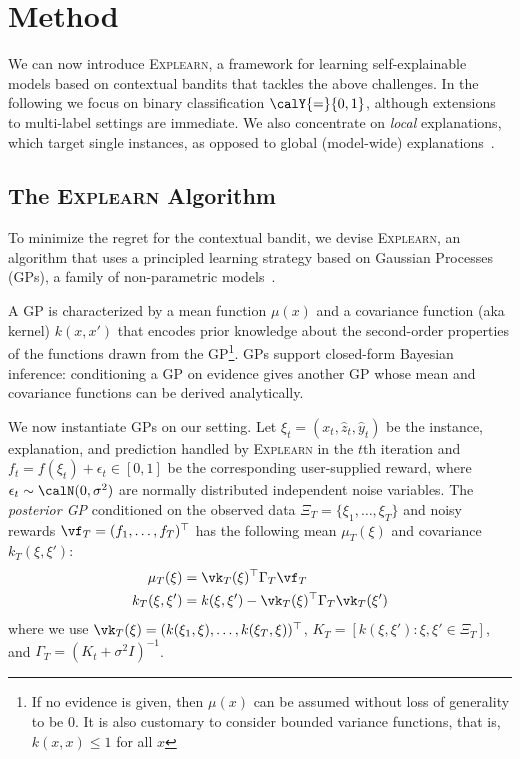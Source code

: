 \documentclass[letterpaper]{article} %
\newcommand{\explearn}{\textsc{Explearn}\xspace}
\begin{document}
\section{Method}\label{sec:solution}

We can now introduce \explearn, a framework for learning self-explainable models based on contextual bandits that tackles the above challenges.
%
In the following we focus on binary classification $\calY {=} \{0, 1\}$,  although extensions to multi-label settings are immediate.  We also concentrate on \emph{local} explanations, which target single instances, as opposed to global (model-wide) explanations~\cite{bastani2017interpreting}.


\subsection{The \explearn Algorithm}

To minimize the regret for the contextual bandit, we devise \explearn, an algorithm that uses a principled learning strategy based on Gaussian Processes (GPs), a family of non-parametric models~\cite{rasmussen2006gaussian}.

A GP is characterized by a mean function $\mu(x)$ and a covariance function (aka kernel) $k(x,x')$ that encodes prior knowledge about the second-order properties of the functions drawn from the GP\footnote{If no evidence is given, then $\mu(x)$ can be assumed without loss of generality to be $0$.  It is also customary to consider bounded variance functions, that is, $k(x,x) \le 1$ for all $x$}.  GPs support closed-form Bayesian inference:  conditioning a GP on evidence gives another GP whose mean and covariance functions can be derived analytically.

We now instantiate GPs on our setting.  Let $\xi_t = (x_t, \hat{z}_t, \hat{y}_t)$  be the instance, explanation, and prediction handled by \explearn in the $t$th iteration and $f_t = f(\xi_t) + \epsilon_t \in [0, 1]$ be the corresponding user-supplied reward, where $\epsilon_t \sim \calN(0, \sigma^2)$ are normally distributed independent noise variables.
The \emph{posterior GP} conditioned on the observed data $\Xi_T = \{\xi_1, \ldots, \xi_T\}$ and noisy rewards $\vf_T = (f_1, \ldots, f_T)^\top$ has the following mean $\mu_T(\xi)$ and covariance $k_T(\xi, \xi')$:
%
\begin{align}
    \mu_T(\xi)
        & = \vk_T(\xi)^\top \Gamma_T \vf_T
        \label{eq:mut}
    \\
    k_T(\xi, \xi')
        & = k(\xi, \xi') - \vk_T(\xi)^\top \Gamma_T \vk_T(\xi')
        \label{eq:kt}
\end{align}
%
where we use $\vk_T(\xi) = (k(\xi_1, \xi), \ldots, k(\xi_T, \xi))^\top$, $K_T = [k(\xi, \xi') : \xi, \xi' \in \Xi_T]$, and $\Gamma_T = (K_t + \sigma^2 I)^{-1}$.
\end{document}
